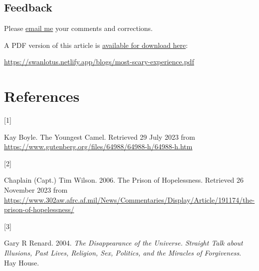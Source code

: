 \documentclass[
  a4paper,
]{article}
\newlength{\cslhangindent}
\newlength{\csllabelwidth}
\newlength{\cslentryspacingunit} %
\newenvironment{CSLReferences}[2] %
 {%
  \setlength{\parindent}{0pt}
  \ifodd #1
  \let\oldpar\par
  \def\par{\hangindent=\cslhangindent\oldpar}
  \fi
  \setlength{\parskip}{#2\cslentryspacingunit}
 }%
 {}
\newcommand{\CSLLeftMargin}[1]{\parbox[t]{\csllabelwidth}{#1}}
\newcommand{\CSLRightInline}[1]{\parbox[t]{\linewidth - \csllabelwidth}{#1}\break}
\begin{document}
\hypertarget{feedback}{%
\subsection{Feedback}\label{feedback}}

Please \href{mailto:feedback.swanlotus@gmail.com}{email me} your
comments and corrections.

\noindent A PDF version of this article is
\href{./most-scary-experience.pdf}{available for download here}:

\begin{small}

\begin{sffamily}

\url{https://swanlotus.netlify.app/blogs/most-scary-experience.pdf}

\end{sffamily}

\end{small}

\hypertarget{bibliography}{%
\section*{References}\label{bibliography}}

\hypertarget{refs}{}
\begin{CSLReferences}{0}{0}
\leavevmode{}%
\CSLLeftMargin{{[}1{]} }%
\CSLRightInline{Kay Boyle. {The Youngest Camel}. Retrieved 29 July 2023
from \url{https://www.gutenberg.org/files/64988/64988-h/64988-h.htm}}

\leavevmode{}%
\CSLLeftMargin{{[}2{]} }%
\CSLRightInline{Chaplain (Capt.) Tim Wilson. 2006. {The Prison of
Hopelessness}. Retrieved 26 November 2023 from
\url{https://www.302aw.afrc.af.mil/News/Commentaries/Display/Article/191174/the-prison-of-hopelessness/}}

\leavevmode{}%
\CSLLeftMargin{{[}3{]} }%
\CSLRightInline{Gary R Renard. 2004. \emph{{The Disappearance of the
Universe}. {Straight Talk about Illusions, Past Lives, Religion, Sex,
Politics, and the Miracles of Forgiveness}}. Hay House.}

\end{CSLReferences}
\end{document}
